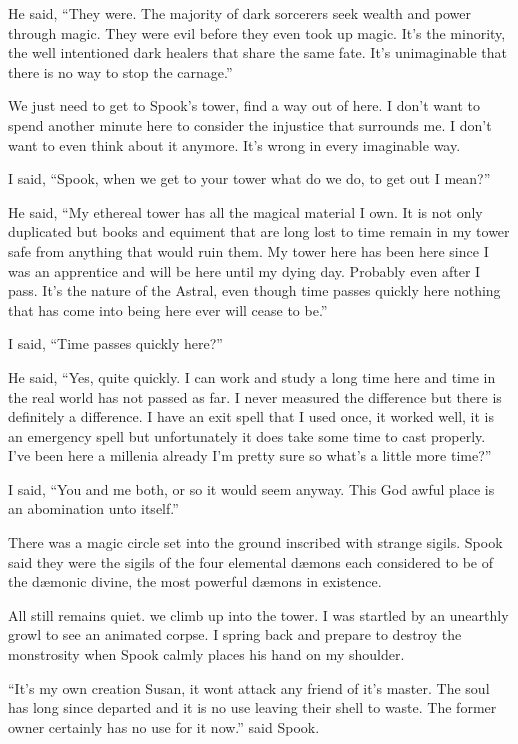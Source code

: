He said, ``They were. The majority of dark sorcerers seek wealth and power through magic. They were evil before they even took up magic. It's the minority, the well intentioned dark healers that share the same fate. It's unimaginable that there is no way to stop the carnage.''

We just need to get to Spook's tower, find a way out of here. I don't want to spend another minute here to consider the injustice that surrounds me. I don't want to even think about it anymore. It's wrong in every imaginable way.

I said, ``Spook, when we get to your tower what do we do, to get out I mean?''

He said, ``My ethereal tower has all the magical material I own. It is not only duplicated but books and equiment that are long lost to time remain in my tower safe from anything that would ruin them. My tower here has been here since I was an apprentice and will be here until my dying day. Probably even after I pass. It's the nature of the Astral, even though time passes quickly here nothing that has come into being here ever will cease to be.''

I said, ``Time passes quickly here?''

He said, ``Yes, quite quickly. I can work and study a long time here and time in the real world has not passed as far. I never measured the difference but there is definitely a difference. I have an exit spell that I used once, it worked well, it is an emergency spell but unfortunately it does take some time to cast properly. I've been here a millenia already I'm pretty sure so what's a little more time?''

I said, ``You and me both, or so it would seem anyway. This God awful place is an abomination unto itself.''

There was a magic circle set into the ground inscribed with strange sigils. Spook said they were the sigils of the four elemental d\ae mons each considered to be of the d\ae monic divine, the most powerful d\ae mons in existence.

All still remains quiet. we climb up into the tower. I was startled by an unearthly growl to see an animated corpse. I spring back and prepare to destroy the monstrosity when Spook calmly places his hand on my shoulder.

``It's my own creation Susan, it wont attack any friend of it's master. The soul has long since departed and it is no use leaving their shell to waste. The former owner certainly has no use for it now.'' said Spook.

